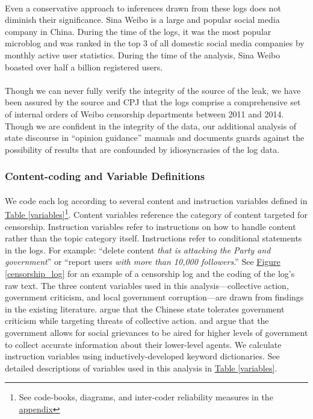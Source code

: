 \documentclass[12pt]{article}
\begin{document}
\begin{CJK*}{UTF8}{gbsn}
\paragraph{} Even a conservative approach to inferences drawn from these logs does not diminish their significance. Sina Weibo is a large and popular social media company in China. During the time of the logs, it was the most popular microblog and was ranked in the top 3 of all domestic social media companies by monthly active user statistics. During the time of the analysis, Sina Weibo boasted over half a billion registered users. 
\paragraph{} Though we can never fully verify the integrity of the source of the leak, we have been assured by the source and CPJ that the logs comprise a comprehensive set of internal orders of Weibo censorship departments between 2011 and 2014. Though we are confident in the integrity of the data, our additional analysis of state discourse in ``opinion guidance'' manuals and documents guards against the possibility of results that are confounded by idiosyncrasies of the log data.

\subsubsection{Content-coding and Variable Definitions}

\paragraph{} We code each log according to several content and instruction variables defined in \hyperref[variables]{Table \ref*{variables}}\footnote{See code-books, diagrams, and inter-coder reliability measures in the \hyperref[appendix]{appendix}}. Content variables reference the category of content targeted for censorship. Instruction variables refer to instructions on how to handle content rather than the topic category itself. Instructions refer to conditional statements in the logs. For example: ``delete content {\it that is attacking the Party and government}'' or ``report users {\it with more than 10,000 followers}.'' See \hyperref[censorship_log]{Figure \ref*{censorship_log}} for an example of a censorship log and the coding of the log's raw text. The three content variables used in this analysis---collective action, government criticism, and local government corruption---are drawn from findings in the existing literature. \cite{king2013censorship} argue that the Chinese state tolerates government criticism while targeting threats of collective action. \cite{dimitrov2017political} and \cite{lorentzen2014china} argue that the government allows for social grievances to be aired for higher levels of government to collect accurate information about their lower-level agents. We calculate instruction variables using inductively-developed keyword dictionaries. See detailed descriptions of variables used in this analysis in \hyperref[variables]{Table \ref*{variables}}.


\end{CJK*}
\end{document}
